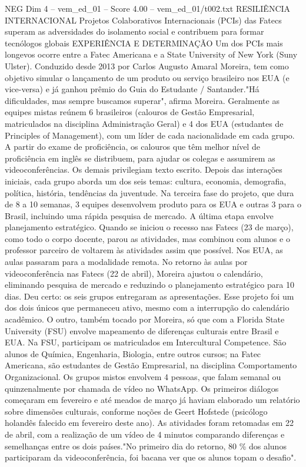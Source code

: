 \begin{textsample}{NEG Dim 4 – vem\_ed\_01 – Score 4.00 – vem\_ed\_01/t002.txt}  \label{ex:f4_neg_153}
RESILIÊNCIA INTERNACIONAL Projetos Colaborativos Internacionais (PCIs) das Fatecs superam as adversidades do isolamento social e contribuem para formar tecnólogos globais EXPERIÊNCIA E DETERMINAÇÃO Um dos PCIs mais longevos ocorre entre a Fatec Americana e a State University of New York (Suny Ulster).
Conduzido desde 2013 por Carlos Augusto Amaral Moreira, tem como objetivo simular o lançamento de um produto ou serviço brasileiro nos EUA (e vice-versa) e já ganhou prêmio do Guia do Estudante / Santander."Há dificuldades, mas sempre buscamos superar", afirma Moreira.
Geralmente as equipes mistas reúnem 6 brasileiros (calouros de Gestão Empresarial, matriculados na disciplina Administração Geral) e 4 dos EUA (estudantes de Principles of Management), com um líder de cada nacionalidade em cada grupo.
A partir do exame de proficiência, os calouros que têm melhor nível de proficiência em inglês se distribuem, para ajudar os colegas e assumirem as videoconferências.
Os demais privilegiam texto escrito.
Depois das interações iniciais, cada grupo aborda um dos seis temas: cultura, economia, demografia, política, história, tendências da juventude.
Na terceira fase do projeto, que dura de 8 a 10 semanas, 3 equipes desenvolvem produto para os EUA e outras 3 para o Brasil, incluindo uma rápida pesquisa de mercado.
A última etapa envolve planejamento estratégico.
Quando se iniciou o recesso nas Fatecs (23 de março), como todo o corpo docente, parou as atividades, mas combinou com alunos e o professor parceiro de voltarem às atividades assim que possível.
Nos EUA, as aulas passaram para a modalidade remota.
No retorno às aulas por videoconferência nas Fatecs (22 de abril), Moreira ajustou o calendário, eliminando pesquisa de mercado e reduzindo o planejamento estratégico para 10 dias.
Deu certo: os seis grupos entregaram as apresentações.
Esse projeto foi um dos dois únicos que permaneceu ativo, mesmo com a interrupção do calendário acadêmico.
O outro, também tocado por Moreira, só que com a Florida State University (FSU) envolve mapeamento de diferenças culturais entre Brasil e EUA.
Na FSU, participam os matriculados em Intercultural Competence.
São alunos de Química, Engenharia, Biologia, entre outros cursos; na Fatec Americana, são estudantes de Gestão Empresarial, na disciplina Comportamento Organizacional.
Os grupos mistos envolvem 4 pessoas, que falam semanal ou quinzenalmente por chamada de vídeo no WhatsApp.
Os primeiros diálogos começaram em fevereiro e até meados de março já haviam elaborado um relatório sobre dimensões culturais, conforme noções de Geert Hofstede (psicólogo holandês falecido em fevereiro deste ano).
As atividades foram retomadas em 22 de abril, com a realização de um vídeo de 4 minutos comparando diferenças e semelhanças entre os dois países."No primeiro dia do retorno, 80 \% dos alunos participaram da videoconferência, foi bacana ver que os alunos topam o desafio".

\end{textsample}
